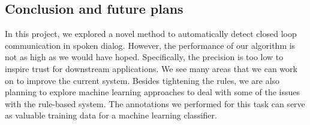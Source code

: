 \subsection{Conclusion and future plans}

In this project, we explored a novel method to automatically detect closed loop
communication in spoken dialog. However, the performance of our algorithm is
not as high as we would have hoped. Specifically, the precision is too low to
inspire trust for downstream applications. We see many areas that we can work
on to improve the current system.  Besides tightening the rules, we are also
planning to explore machine learning approaches to deal with some of the issues
with the rule-based system. The annotations we performed for this task can
serve as valuable training data for a machine learning classifier.
